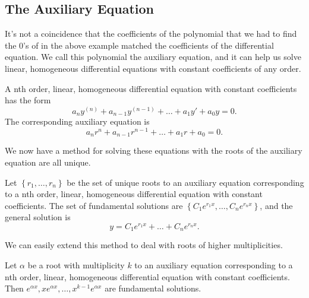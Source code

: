 \subsection{The Auxiliary Equation}
\noindent
It's not a coincidence that the coefficients of the polynomial that we had to find the 0's of in the above example matched the coefficients of the differential equation.
We call this polynomial the auxiliary equation, and it can help us solve linear, homogeneous differential equations with constant coefficients of any order.
\begin{definition}
	A nth order, linear, homogeneous differential equation with constant coefficients has the form
	\begin{equation*}
		a_ny^{(n)} + a_{n-1}y^{(n-1)} + \ldots + a_1y' + a_0y = 0.
	\end{equation*}
	The corresponding auxiliary equation is
	\begin{equation*}
		a_nr^n + a_{n-1}r^{n-1} + \ldots + a_1r + a_0 = 0.
	\end{equation*}
\end{definition}

\noindent
We now have a method for solving these equations with the roots of the auxiliary equation are all unique. 
\begin{theorem}
	Let $\left\{r_1, \ldots, r_n\right\}$ be the set of unique roots to an auxiliary equation corresponding to a nth order, linear, homogeneous differential equation with constant coefficients.
	The set of fundamental solutions are $\left\{C_1e^{r_1x}, \ldots, C_ne^{r_nx}\right\}$, and the general solution is
	\begin{equation*}
		y = C_1e^{r_1x} + \ldots + C_ne^{r_nx}.
	\end{equation*}
\end{theorem}

\noindent
We can easily extend this method to deal with roots of higher multiplicities.
\begin{theorem}
	Let $\alpha$ be a root with multiplicity $k$ to an auxiliary equation corresponding to a nth order, linear, homogeneous differential equation with constant coefficients.
	Then $e^{\alpha x}, xe^{\alpha x}, \ldots, x^{k-1}e^{\alpha x}$ are fundamental solutions.
\end{theorem}

